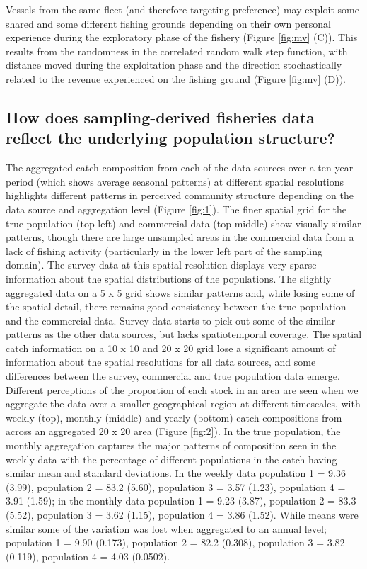\documentclass[review]{elsarticle}
\begin{document}
Vessels from the same fleet (and therefore targeting preference) may exploit
some shared and some different fishing grounds depending on their own personal
experience during the exploratory phase of the fishery (Figure \ref{fig:mv} (C)).
This results from the randomness in the correlated random walk step function,
with distance moved during the exploitation phase and the direction
stochastically related to the revenue experienced on the fishing ground (Figure
\ref{fig:mv} (D)). 

\subsection{How does sampling-derived fisheries data reflect the underlying
	population structure?}

The aggregated catch composition from each of the data sources over a ten-year
period (which shows average seasonal patterns) at different spatial resolutions
highlights different patterns in perceived community structure depending on the
data source and aggregation level (Figure \ref{fig:1}). The finer spatial grid
for the true population (top left) and commercial data (top middle) show
visually similar patterns, though there are large unsampled areas in the
commercial data from a lack of fishing activity (particularly in the lower left
part of the sampling domain). The survey data at this spatial resolution
displays very sparse information about the spatial distributions of the
populations. The slightly aggregated data on a 5 x 5 grid shows similar
patterns and, while losing some of the spatial detail, there remains good
consistency between the true population and the commercial data. Survey data
starts to pick out some of the similar patterns as the other data sources, but
lacks spatiotemporal coverage. The spatial catch information on a 10 x 10 and
20 x 20 grid lose a significant amount of information about the spatial
resolutions for all data sources, and some differences between the survey,
commercial and true population data emerge. \\

Different perceptions of the proportion of each stock in an area are seen when
we aggregate the data over a smaller geographical region at different
timescales, with weekly (top), monthly (middle) and yearly (bottom) catch
compositions from across an aggregated 20 x 20 area (Figure \ref{fig:2}). In
the true population, the monthly aggregation captures the major patterns of
composition seen in the weekly data with the percentage of different
populations in the catch having similar mean and standard deviations.  In the
weekly data population 1 = 9.36 (3.99), population 2 = 83.2 (5.60), population
3 = 3.57 (1.23), population 4 = 3.91 (1.59); in the monthly data population 1 =
9.23 (3.87), population 2 = 83.3 (5.52), population 3 = 3.62 (1.15), population
4 = 3.86 (1.52). While means were similar some of the variation was lost when
aggregated to an annual level; population 1 = 9.90 (0.173), population 2 = 82.2
(0.308), population 3 = 3.82 (0.119), population 4 = 4.03 (0.0502).\\
\end{document}
